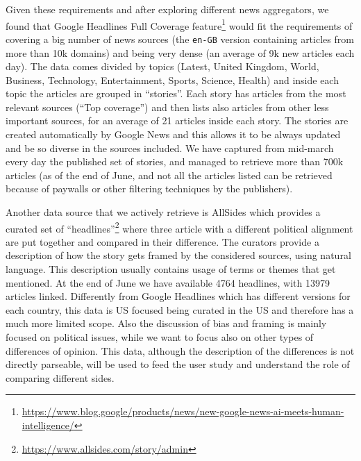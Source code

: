 Given these requirements and after exploring different news aggregators, we found that Google Headlines Full Coverage feature\footnote{\url{https://www.blog.google/products/news/new-google-news-ai-meets-human-intelligence/}} would fit the requirements of covering a big number of news sources (the \texttt{en-GB} version containing articles from more than 10k domains) and being very dense (an average of 9k new articles each day).
The data comes divided by topics (Latest, United Kingdom, World, Business, Technology, Entertainment, Sports, Science, Health) and inside each topic the articles are grouped in ``stories''. Each story has articles from the most relevant sources (``Top coverage'') and then lists also articles from other less important sources, for an average of 21 articles inside each story.
The stories are created automatically by Google News and this allows it to be always updated and be so diverse in the sources included.
We have captured from mid-march every day the published set of stories, and managed to retrieve more than 700k articles (as of the end of June, and not all the articles listed can be retrieved because of paywalls or other filtering techniques by the publishers).

Another data source that we actively retrieve is AllSides which provides a curated set of ``headlines''\footnote{\url{https://www.allsides.com/story/admin}} where three article with a different political alignment are put together and compared in their difference.
The curators provide a description of how the story gets framed by the considered sources, using natural language.
This description usually contains usage of terms or themes that get mentioned.
At the end of June we have available 4764 headlines, with 13979 articles linked.
Differently from Google Headlines which has different versions for each country, this data is US focused being curated in the US and therefore has a much more limited scope. Also the discussion of bias and framing is mainly focused on political issues, while we want to focus also on other types of differences of opinion.
This data, although the description of the differences is not directly parseable, will be used to feed the user study and understand the role of comparing different sides.


